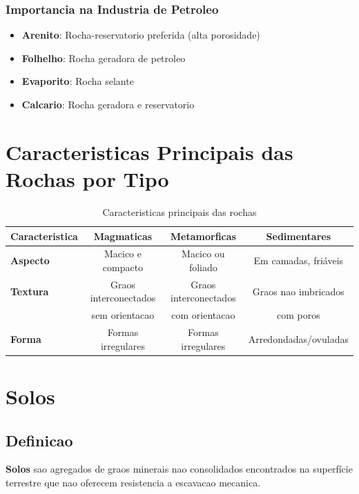 \documentclass[12pt,a4paper,twoside]{book}
\begin{document}
\subsubsection{Importancia na Industria de Petroleo}

\begin{itemize}
    \item \textbf{Arenito}: Rocha-reservatorio preferida (alta porosidade)
    \item \textbf{Folhelho}: Rocha geradora de petroleo
    \item \textbf{Evaporito}: Rocha selante
    \item \textbf{Calcario}: Rocha geradora e reservatorio
\end{itemize}

\section{Caracteristicas Principais das Rochas por Tipo}

\begin{table}[h]
\centering
\begin{tabular}{|l|c|c|c|}
\hline
\textbf{Caracteristica} & \textbf{Magmaticas} & \textbf{Metamorficas} & \textbf{Sedimentares} \\
\hline
\textbf{Aspecto} & Macico e compacto & Macico ou foliado & Em camadas, friáveis \\
\hline
\textbf{Textura} & Graos interconectados & Graos interconectados & Graos nao imbricados \\
& sem orientacao & com orientacao & com poros \\
\hline
\textbf{Forma} & Formas irregulares & Formas irregulares & Arredondadas/ovuladas \\
\hline
\end{tabular}
\caption{Caracteristicas principais das rochas}
\label{tab:rochas}
\end{table}

\section{Solos}

\subsection{Definicao}

\textbf{Solos} sao agregados de graos minerais nao consolidados encontrados na superfície terrestre 
que nao oferecem resistencia a escavacao mecanica.
\end{document}
